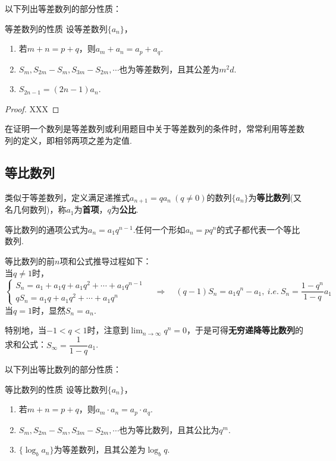 \documentclass[lang=cn, zihao=4.5]{elegantbook}
\begin{document}
以下列出等差数列的部分性质：

\begin{proposition}{等差数列的性质}
	设等差数列$\{ a_n \}$，
	\begin{enumerate}
		\item 若$m+n=p+q$，则$a_m+a_n=a_p+a_q$.
		\item $S_m,S_{2m}-S_m,S_{3m}-S_{2m},\cdots $也为等差数列，且其公差为$m^2d$.
		\item $S_{2n-1}=(2n-1)a_n$.
	\end{enumerate}
\end{proposition}
\begin{proof}
	XXX
\end{proof}

在证明一个数列是等差数列或利用题目中关于等差数列的条件时，常常利用等差数列的定义，即相邻两项之差为定值.

\subsection{等比数列}

类似于等差数列，定义满足递推式$a_{n+1}=qa_n ~(q \neq 0)$的数列$\{ a_n \}$为\textbf{等比数列}(又名几何数列)，称$a_1$为\textbf{首项}，$q$为\textbf{公比}.

等比数列的通项公式为$a_n = a_1 q^{n-1}$.任何一个形如$a_n=pq^n$的式子都代表一个等比数列.

等比数列的前$n$项和公式推导过程如下： \\
当$q \neq 1$时，
$$\begin{cases}
	S_n = a_1 + a_1q + a_1q^2 + \cdots + a_1q^{n-1} \\
	qS_n = a_1q + a_1q^2 + \cdots + a_1q^{n} 
\end{cases}
\quad \Longrightarrow \quad
(q-1)S_n = a_1q^{n} - a_1,~i.e.~S_n = \frac{1-q^n}{1-q} a_1
$$
当$q = 1$时，显然$S_n = a_n$.

特别地，当$-1<q<1$时，注意到$\lim _{n \to \infty} q^n=0$，于是可得\textbf{无穷递降等比数列}的求和公式：$S_{\infty} = \dfrac{1}{1-q}a_1$.

以下列出等比数列的部分性质：

\begin{proposition}{等比数列的性质}
	设等比数列$\{ a_n \}$，
	\begin{enumerate}
		\item 若$m+n=p+q$，则$a_m \cdot a_n = a_p \cdot a_q$.
		\item $S_m,S_{2m}-S_m,S_{3m}-S_{2m},\cdots $也为等比数列，且其公比为$q^{m}$.
		\item $\{ \log _{b}{a_n} \}$为等差数列，且其公差为$\log _{b}{q}$.
	\end{enumerate}
\end{proposition}
\end{document}
